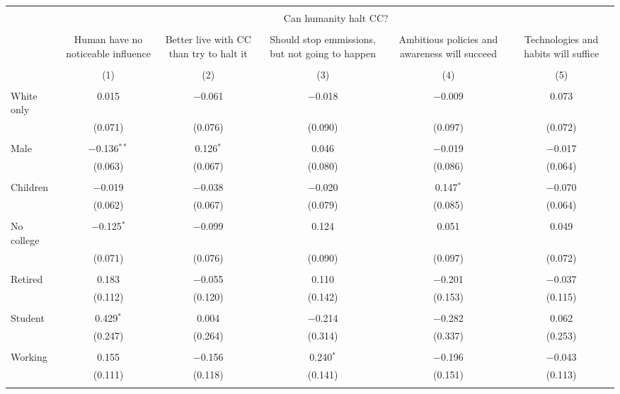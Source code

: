 
\begin{tabular}{@{\extracolsep{5pt}}lccccc} 
\\[-1.8ex]\hline 
\hline \\[-1.8ex] 
 & \multicolumn{5}{c}{Can humanity halt CC?} \\ 
\cline{2-6} 
\\[-1.8ex] & Human have no noticeable influence & Better live with CC than try to halt it & Should stop emmissions, but not going to happen & Ambitious policies and awareness will succeed & Technologies and habits will suffice \\ 
\\[-1.8ex] & (1) & (2) & (3) & (4) & (5)\\ 
\hline \\[-1.8ex] 
 White only & 0.015 & $-$0.061 & $-$0.018 & $-$0.009 & 0.073 \\ 
  & (0.071) & (0.076) & (0.090) & (0.097) & (0.072) \\ 
  & & & & & \\ 
 Male & $-$0.136$^{**}$ & 0.126$^{*}$ & 0.046 & $-$0.019 & $-$0.017 \\ 
  & (0.063) & (0.067) & (0.080) & (0.086) & (0.064) \\ 
  & & & & & \\ 
 Children & $-$0.019 & $-$0.038 & $-$0.020 & 0.147$^{*}$ & $-$0.070 \\ 
  & (0.062) & (0.067) & (0.079) & (0.085) & (0.064) \\ 
  & & & & & \\ 
 No college & $-$0.125$^{*}$ & $-$0.099 & 0.124 & 0.051 & 0.049 \\ 
  & (0.071) & (0.076) & (0.090) & (0.097) & (0.072) \\ 
  & & & & & \\ 
 Retired & 0.183 & $-$0.055 & 0.110 & $-$0.201 & $-$0.037 \\ 
  & (0.112) & (0.120) & (0.142) & (0.153) & (0.115) \\ 
  & & & & & \\ 
 Student & 0.429$^{*}$ & 0.004 & $-$0.214 & $-$0.282 & 0.062 \\ 
  & (0.247) & (0.264) & (0.314) & (0.337) & (0.253) \\ 
  & & & & & \\ 
 Working & 0.155 & $-$0.156 & 0.240$^{*}$ & $-$0.196 & $-$0.043 \\ 
  & (0.111) & (0.118) & (0.141) & (0.151) & (0.113) \\ 
  & & & & & \\ 

\end{tabular}
